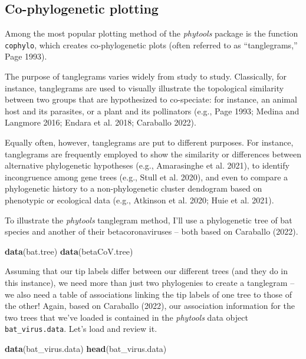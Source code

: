 \documentclass[fleqn,10pt,lineno]{wlpeerj} %
\newenvironment{Shaded}{\begin{snugshade}}{\end{snugshade}}
\newcommand{\FunctionTok}[1]{\textcolor[rgb]{0.13,0.29,0.53}{\textbf{#1}}}
\newcommand{\NormalTok}[1]{#1}
\begin{document}
\hypertarget{co-phylogenetic-plotting}{%
\subsection{Co-phylogenetic plotting}\label{co-phylogenetic-plotting}}

Among the most popular plotting method of the \emph{phytools} package is the function \texttt{cophylo}, which creates co-phylogenetic plots (often referred to as ``tanglegrams,'' Page 1993).

The purpose of tanglegrams varies widely from study to study. Classically, for instance, tanglegrams are used to visually illustrate the topological similarity between two groups that are hypothesized to co-speciate: for instance, an animal host and its parasites, or a plant and its pollinators (e.g., Page 1993; Medina and Langmore 2016; Endara et al. 2018; Caraballo 2022).

Equally often, however, tanglegrams are put to different purposes. For instance, tanglegrams are frequently employed to show the similarity or differences between alternative phylogenetic hypotheses (e.g., Amarasinghe et al. 2021), to identify incongruence among gene trees (e.g., Stull et al. 2020), and even to compare a phylogenetic history to a non-phylogenetic cluster dendogram based on phenotypic or ecological data (e.g., Atkinson et al. 2020; Huie et al. 2021).

To illustrate the \emph{phytools} tanglegram method, I'll use a phylogenetic tree of bat species and another of their betacoronaviruses -- both based on Caraballo (2022).

\begin{Shaded}
\begin{Highlighting}[]
\FunctionTok{data}\NormalTok{(bat.tree)}
\FunctionTok{data}\NormalTok{(betaCoV.tree)}
\end{Highlighting}
\end{Shaded}

Assuming that our tip labels differ between our different trees (and they do in this instance), we need more than just two phylogenies to create a tanglegram -- we also need a table of associations linking the tip labels of one tree to those of the other! Again, based on Caraballo (2022), our association information for the two trees that we've loaded is contained in the \emph{phytools} data object \texttt{bat\_virus.data}. Let's load and review it.

\begin{Shaded}
\begin{Highlighting}[]
\FunctionTok{data}\NormalTok{(bat\_virus.data)}
\FunctionTok{head}\NormalTok{(bat\_virus.data)}
\end{Highlighting}
\end{Shaded}
\end{document}
